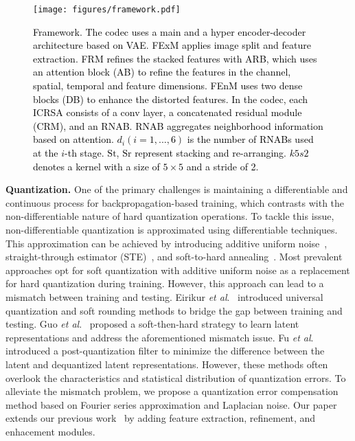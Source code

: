 \begin{figure*}
	\centering
	\begin{minipage}{\textwidth}
	\centering
	\texttt{[image: figures/framework.pdf]}
	\caption{\textcolor{black}{Framework. The codec uses a main and a hyper encoder-decoder architecture based on VAE. FExM applies image split and feature extraction. FRM refines the stacked features with ARB, which uses an attention block (AB) to refine the features in the channel, spatial, temporal and feature dimensions. FEnM uses two dense blocks (DB) to enhance the distorted features. In the codec, each ICRSA consists of a conv layer, a concatenated residual module (CRM), and an RNAB. RNAB \cite{lu2022high} aggregates neighborhood information based on attention. $d_i(i=1,...,6)$ is the number of RNABs used at the $i$-th stage. $\mathrm{St}$, $\mathrm{Sr}$ represent stacking and re-arranging. $k5s2$ denotes a kernel with a size of $5 \times 5$ and a stride of 2. }}
	\label{fig:framework}
	\end{minipage}
\end{figure*}

\textbf{Quantization.} One of the primary challenges is maintaining a differentiable and continuous process for backpropagation-based training, which contrasts with the non-differentiable nature of hard quantization operations. To tackle this issue, non-differentiable quantization is approximated using differentiable techniques. This approximation can be achieved by introducing additive uniform noise~\cite{balle2016end,balle2018variational,minnen2018joint,fu2023learned,kim2022joint}, straight-through estimator (STE)~\cite{bengio2013estimating}, and soft-to-hard annealing~\cite{agustsson2017soft,yang2020improving}. Most prevalent approaches opt for soft quantization with additive uniform noise as a replacement for hard quantization during training. However, this approach can lead to a mismatch between training and testing. Eirikur \textit{et al}.~\cite{agustsson2020universally} introduced universal quantization and soft rounding methods to bridge the gap between training and testing. Guo \textit{et al}.~\cite{guo2021soft} proposed a soft-then-hard strategy to learn latent representations and address the aforementioned mismatch issue. Fu \textit{et al}.~\cite{fu2022asymmetric} introduced a post-quantization filter to minimize the difference between the latent and dequantized latent representations. However, these methods often overlook the characteristics and statistical distribution of quantization errors. To alleviate the mismatch problem, we propose a quantization error compensation method based on Fourier series approximation and Laplacian noise. Our paper extends our previous work~\cite{jiang23} by adding feature extraction, refinement, and enhacement modules.